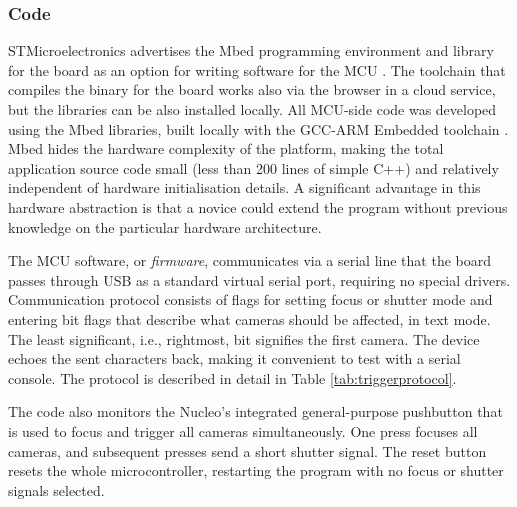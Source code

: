 


\subsubsection{Code}

STMicroelectronics advertises the Mbed programming environment and library for the board as an option for writing software for the MCU \cite{mbednucleo}.
The toolchain that compiles the binary for the board works also via the browser in a cloud service, but the libraries can be also installed locally.
All MCU-side code was developed using the Mbed libraries, built locally with the GCC-ARM Embedded toolchain \cite{launchpad-gcc-arm}.
Mbed hides the hardware complexity of the platform, making the total application source code small (less than 200 lines of simple C++) and relatively independent of hardware initialisation details.
A significant advantage in this hardware abstraction is that a novice could extend the program without previous knowledge on the particular hardware architecture.

The MCU software, or \emph{firmware}, communicates via a serial line that the board passes through USB as a standard virtual serial port, requiring no special drivers.
Communication protocol consists of flags for setting focus or shutter mode and entering bit flags that describe what cameras should be affected, in text mode.
The least significant, i.e., rightmost, bit signifies the first camera.
The device echoes the sent characters back, making it convenient to test with a serial console.
The protocol is described in detail in Table \ref{tab:triggerprotocol}.

The code also monitors the Nucleo's integrated general-purpose pushbutton that is used to focus and trigger all cameras simultaneously.
One press focuses all cameras, and subsequent presses send a short shutter signal.
The reset button resets the whole microcontroller, restarting the program with no focus or shutter signals selected.

